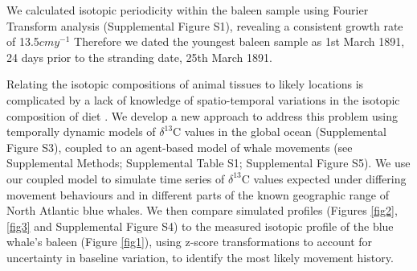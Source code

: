 \documentclass[a4paper,12pt]{article}
\begin{document}
We calculated isotopic periodicity within the baleen sample using Fourier Transform analysis 
(Supplemental Figure S1), revealing a consistent growth rate of 13.5$cmy^{-1}$ %
Therefore we dated the youngest baleen sample as 1st March 1891, 24 days prior to the stranding date, 25th March 1891. 
 

Relating the isotopic compositions of animal tissues to likely locations is complicated by a lack of knowledge of spatio-temporal variations in the isotopic composition of diet \cite{west2006stable}.
We develop a new approach to address this problem using temporally dynamic models of $\delta^{13}$C values in the global ocean \cite{magozzi2017using} (Supplemental Figure S3), coupled to an agent-based model of whale movements (see Supplemental Methods; Supplemental Table S1; Supplemental Figure S5).  
We use our coupled model to simulate time series of $\delta^{13}$C values expected under differing movement behaviours and in different parts of the known geographic range of North Atlantic blue whales. 
We then compare simulated profiles (Figures \ref{fig2}, \ref{fig3} and Supplemental Figure S4) to the measured isotopic profile of the blue whale's baleen (Figure \ref{fig1}), using z-score transformations to account for uncertainty in baseline variation, to identify the most likely movement history. 
\end{document}
